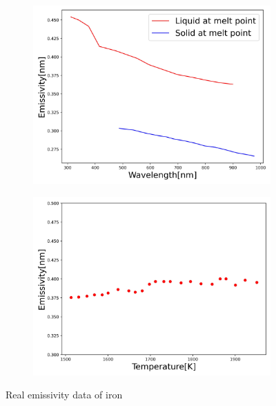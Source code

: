 \begin{figure}[htbp]
  \centering
  \begin{subfigure}{0.49\textwidth}
    \centering
    \includegraphics[width=\textwidth]{figures/emissivity_wl_iron.jpg}
    \label{fig: emissivity_wl_iron}
  \end{subfigure}
  \begin{subfigure}{0.49\textwidth}
    \centering
    \includegraphics[width=\textwidth]{figures/emissivity_temp_iron.jpg}
    \label{fig: emissivity_temp_iron}
  \end{subfigure}
  \caption{Real emissivity data of iron}
  \label{fig: emissivity_iron_raw}
\end{figure}


